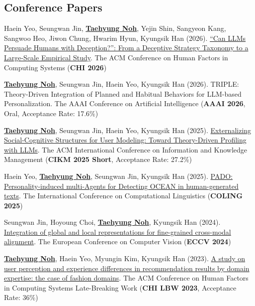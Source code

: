 \documentclass[a4paper,11pt]{article}
\begin{document}
\subsection*{\textbf{Conference Papers}}
\vspace{-2mm}
\small{
\begin{enumerate}[leftmargin=*, labelsep=0.5em, align=left, widest={[\textbf{C.1}]}, itemindent=0em, label={\textbf{[C.\arabic*]}}]

\item Haein Yeo, Seungwan Jin, \underline{\textbf{Taehyung Noh}}, Yejin Shin, Sangyeon Kang, Sangwoo Heo, Jiwon Chung, Hwarim Hyun, Kyungsik Han (2026). \href{https://astlyi.s3.ap-northeast-2.amazonaws.com/2026/2026_CHI_Can_LLMs_Persuade_Humans_with_Deception.pdf}{``Can LLMs Persuade Humans with Deception?'': From a Deceptive Strategy Taxonomy to a Large-Scale Empirical Study}. The ACM Conference on Human Factors in Computing Systems (\textbf{CHI 2026})

\item \underline{\textbf{Taehyung Noh}}, Seungwan Jin, Haein Yeo, Kyungsik Han (2026). TRIPLE: Theory-Driven Integration of Planned and Habitual Behaviors for LLM-based Personalization. The AAAI Conference on Artificial Intelligence (\textbf{AAAI 2026}, Oral, Acceptance Rate: 17.6\%)

\item \underline{\textbf{Taehyung Noh}}, Seungwan Jin, Haein Yeo, Kyungsik Han (2025). \href{https://dl.acm.org/doi/10.1145/3746252.3760965}{Externalizing Social-Cognitive Structures for User Modeling: Toward Theory-Driven Profiling with LLMs}. The ACM International Conference on Information and Knowledge Management (\textbf{CIKM 2025 Short}, Acceptance Rate: 27.2\%)

\item Haein Yeo, \underline{\textbf{Taehyung Noh}}, Seungwan Jin, Kyungsik Han (2025). \href{https://aclanthology.org/2025.coling-main.382/}{PADO: Personality-induced multi-Agents for Detecting OCEAN in human-generated texts}. The International Conference on Computational Linguistics (\textbf{COLING 2025})

\item Seungwan Jin, Hoyoung Choi, \underline{\textbf{Taehyung Noh}}, Kyungsik Han (2024). \href{https://link.springer.com/chapter/10.1007/978-3-031-73010-8_4}{Integration of global and local representations for fine-grained cross-modal alignment}. The European Conference on Computer Vision (\textbf{ECCV 2024})

\item \underline{\textbf{Taehyung Noh}}, Haein Yeo, Myungin Kim, Kyungsik Han (2023). \href{https://dl.acm.org/doi/abs/10.1145/3544549.3585641}{A study on user perception and experience differences in recommendation results by domain expertise: the case of fashion domains}. The ACM Conference on Human Factors in Computing Systems Late-Breaking Work (\textbf{CHI LBW 2023}, Acceptance Rate: 36\%)

\end{enumerate}
}
\end{document}

